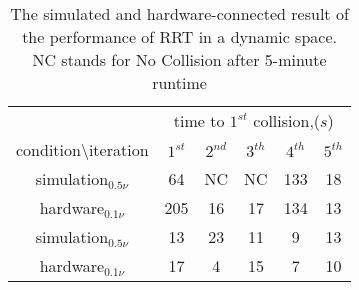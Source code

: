 \begin{table}
  \captionsetup{justification=centering}
  \caption{The simulated and hardware-connected result of the performance of RRT in a dynamic space. NC stands for No Collision after 5-minute runtime}
  \centering
  \label{tab:experiment_table}
\begin{tabular}{cccccc} 
 \hline\hline %

  & \multicolumn{5}{c}{time to $1^{st}$ collision,($s$)} \\\cline{2-6}

  condition\textbackslash iteration&  $1^{st}$  &  $2^{nd}$  & $3^{th}$  & $4^{th}$  & $5^{th}$ \\ \hline
  simulation$_{0.5\nu}$ & 64 & NC & NC & 133 & 18  \\
  hardware$_{0.1\nu}$  & 205 & 16 & 17 & 134 & 13 \\
  simulation$_{0.5\nu}$ &  13 & 23 & 11 & 9 & 13\\
  hardware$_{0.1\nu}$  & 17 & 4 & 15 & 7 & 10 \\


  \hline
\end{tabular}
\end{table}
